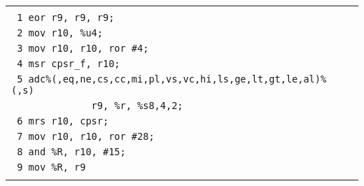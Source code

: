 \begin{center}
\scriptsize
\begin{tabular}{|l|}
\hline
\texttt{}\\
\texttt{ 1~eor~r9,~r9,~r9;~
}\\
\texttt{ 2~mov~r10,~\%u4;
}\\
\texttt{ 3~mov~r10,~r10,~ror~\#4;
}\\
\texttt{ 4~msr~cpsr\_f,~r10;
}\\
\texttt{ 5~adc\%(,eq,ne,cs,cc,mi,pl,vs,vc,hi,ls,ge,lt,gt,le,al)\%(,s)~\
}\\
\texttt{~~~~~~~~~~~~~~r9,~\%r,~\%s8,4,2;
}\\
\texttt{ 6~mrs~r10,~cpsr;
}\\
\texttt{ 7~mov~r10,~r10,~ror~\#28;
}\\
\texttt{ 8~and~\%R,~r10,~\#15;
}\\
\texttt{ 9~mov~\%R,~r9
}\\
\texttt{}\\
\hline
\end{tabular}
\end{center}
